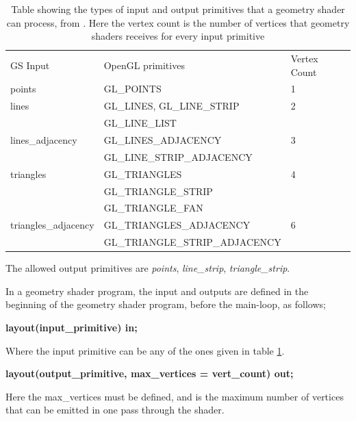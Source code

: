 \documentclass[a4paper, 12pt]{article}
\newcommand{\headcol}{\rowcolor{tableheadcolor}} %
\newcommand{\rowcol}{\rowcolor{tablerowcolor}} %
\begin{document}
\begin{table}
\centering
\caption{Table showing the types of input and output primitives that a geometry shader can process, from \cite{GEOM}. Here the vertex count is the number of vertices that geometry shaders receives for every input primitive }
\label{tab:GSprimitives}
\begin{tabular}{lll} \toprule
GS Input & OpenGL primitives & Vertex Count \\\headcol \midrule
\headcol points& GL\_POINTS​&1\\
\rowcol lines& GL\_LINES​, GL\_LINE\_STRIP​​&2\\
\rowcol &  GL\_LINE\_LIST&\\
\headcol lines\_adjacency&GL\_LINES\_ADJACENCY​&​3\\
\headcol & GL\_LINE\_STRIP\_ADJACENCY&\\
\rowcol triangles&GL\_TRIANGLES​​&4\\
\rowcol & GL\_TRIANGLE\_STRIP​&\\
\rowcol &GL\_TRIANGLE\_FAN&\\
\headcol triangles\_adjacency&GL\_TRIANGLES\_ADJACENCY​​&6\\
\headcol & GL\_TRIANGLE\_STRIP\_ADJACENCY&\\\midrule
\end{tabular}
\end{table}

The allowed output primitives are \emph{points}, \emph{line\_strip}, \emph{triangle\_strip}.

In a geometry shader program, the input and outputs are defined in the beginning of the geometry shader program, before the main-loop, as follows;
\begin{center}
\textbf{layout(input\_primitive​) in;}
\end{center}
Where the input primitive can be any of the ones given in table \ref{tab:GSprimitives}. 
\begin{center}
\textbf{layout(output\_primitive​, max\_vertices = vert\_count​) out;}
\end{center}
Here the max\_vertices must be defined, and is the maximum number of vertices that can be emitted in one pass through the shader.
\end{document}

